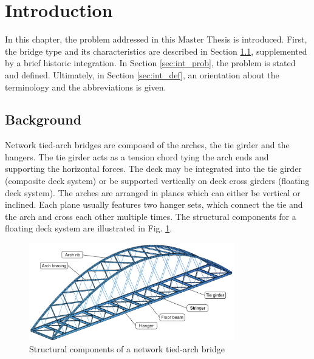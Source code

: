 \section{Introduction}\label{sec:intro}
In this chapter, the problem addressed in this Master Thesis is introduced. First, the bridge type and its characteristics are described in Section \ref{sec:int_back}, supplemented by a brief historic integration. In Section \ref{sec:int_prob}, the problem is stated and defined. Ultimately, in Section \ref{sec:int_def}, an orientation about the terminology and the abbreviations is given. 

\subsection{Background}\label{sec:int_back}
Network tied-arch bridges are composed of the arches, the tie girder and the hangers. The tie girder acts as a tension chord tying the arch ends and supporting the horizontal forces. The deck may be integrated into the tie girder (composite deck system) or be supported vertically on deck cross girders (floating deck system). The arches are arranged in planes which can either be vertical or inclined. Each plane usually features two hanger sets, which connect the tie and the arch and cross each other multiple times. The structural components for a floating deck system are illustrated in Fig. \ref{fig:components_illustration}.

\begin{figure}[H]
    \centering
    \includegraphics[width=0.8\textwidth]{overleaf/Pictures/illustration_components.PNG}
    \caption{Structural components of a network tied-arch bridge}
    \label{fig:components_illustration}
\end{figure}

